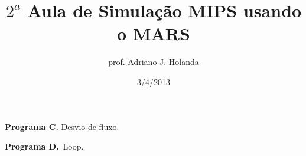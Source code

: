 \documentclass[a4paper]{article}
\begin{document}
\title{$2^a$ Aula de Simulação MIPS usando o MARS}
\date{3/4/2013}
\author{prof. Adriano J. Holanda}
\maketitle

\lstset{}


% 


% 

{\noindent\bf Programa C.} Desvio de fluxo.



\bigskip
{\noindent\bf Programa D.}~Loop.


\end{document}
